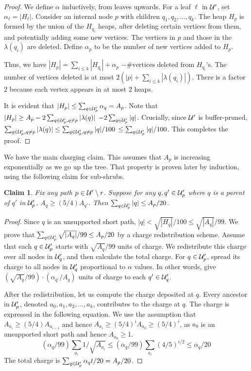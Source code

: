 \documentclass[11pt]{article}
\newtheorem{claim}[theorem]{Claim}
\theoremstyle{definition}
\begin{document}
\begin{proof} We define $\alpha$ inductively, from leaves upwards.
For a leaf $\ell$ in ${\cal U}'$, set $\alpha_\ell = |H_\ell|$. Consider an internal node $p$
with children $q_1, q_2, \ldots, q_k$. The heap $H_p$ is formed by the union
of the $H_{q_i}$ heaps, after deleting certain vertices from them, and potentially
adding some new vertices. 
The vertices in $p$ and those in the $\lambda(q_i)$ are deleted.
Define $\alpha_p$ to be the number of new vertices added to $H_p$.

Thus, we have $|H_p| = \sum_{i \leq k} |H_{q_i}| + \alpha_p$
$- \textrm{\# vertices deleted from $H_{q_i}$'s}$.
The number of vertices deleted is at most $2(|p|+\sum_{i \leq k} |\lambda(q_i)|)$.
There is a factor $2$ because each vertex appears in at most $2$ heaps.

It is evident that $|H_p| \leq \sum_{q \in {\cal U}'_p} \alpha_q = A_p$.
Note that $|H_p| \geq A_p - 2\sum_{q \in {\cal U}'_p, q \neq p} |\lambda(q)|$ $-2\sum_{q \in {\cal U}'_p} |q|$.
Crucially, since ${\cal U}'$ is buffer-pruned, $\sum_{q \in {\cal U}'_p, q \neq p} |\lambda(q)|
\leq \sum_{q \in {\cal U}'_p, q \neq p} |q|/100$ $\leq \sum_{q \in {\cal U}'_p} |q|/100$. This completes the proof.
\end{proof}

We have the main charging claim. This assumes that $A_p$ is increasing exponentially
as we go up the tree. That property is proven later by induction, using
the following claim for sub-shrubs.

\begin{claim} \label{clm:charge} Fix any path $p \in {\cal U}'\setminus r$. Suppose for any $q,q' \in {\cal U}'_p$
where $q$ is a parent of $q'$ in ${\cal U}'_p$, $A_q \geq (5/4)A_{q'}$. Then $\sum_{q \in {\cal U}'_p} |q| \leq A_p/20$.
\end{claim}

\begin{proof} Since $q$ is an unsupported short path, $|q| < \sqrt{|H_q|}/100 \leq \sqrt{|A_q|}/99$.
We prove that $\sum_{q \in {\cal U}'_p} \sqrt{|A_q|}/99 \leq A_p/20$
by a charge redistribution scheme. Assume that each $q \in {\cal U}'_p$
starts with $\sqrt{A_q}/99$ units of charge. We redistribute this charge over all
nodes in ${\cal U}'_q$, and then calculate the total charge. For $q \in {\cal U}'_p$, spread
its charge to all nodes in ${\cal U}'_q$ proportional to $\alpha$ values. In other words,
give $(\sqrt{A_q}/99)\cdot(\alpha_{q'}/A_q)$ units of charge to each $q' \in {\cal U}'_q$.

After the redistribution, let us compute the charge deposited at $q$. Every ancestor in ${\cal U}'_p$,
denoted $a_0, a_1, a_2, \ldots, a_k$, contributes to the charge at $q$. The charge is expressed in the following
equation. We use the assumption that $A_{a_i} \geq (5/4) A_{a_{i-1}}$ and hence $A_{a_i} \geq (5/4)^i A_{a_0} \geq (5/4)^i$, 
as $a_0$ is an unsupported short path and hence $A_{a_0}\geq 1$. 
$$ ({\alpha_q}/99)\sum_{a_i} 1/\sqrt{A_{a_i}} \leq ({\alpha_q}/99)\sum_{a_i} (4/5)^{i/2} \leq \alpha_q/20 $$
The total charge is $\sum_{q \in {\cal U}'_p} \alpha_qt/20 = A_p/20$. 
\end{proof}
\end{document}
